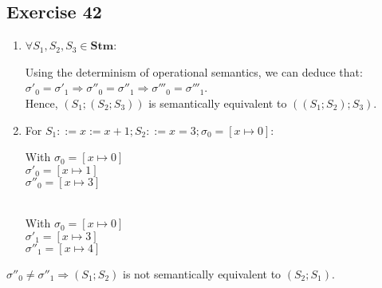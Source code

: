 \documentclass[12pt,fleqn]{article}		%
\begin{document}
\subsection{Exercise 42}
\begin{enumerate}
\item $ \forall S_1, S_2, S_3 \in \textbf{Stm} $:
\begin{prooftree}
\end{prooftree}
\begin{prooftree}
\end{prooftree}
Using the determinism of operational semantics, we can deduce that:\\
$ \sigma'_0 = \sigma'_1 \Rightarrow \sigma''_0 = \sigma''_1 \Rightarrow \sigma'''_0 = \sigma'''_1 $.\\
Hence, $ (S_1; (S_2; S_3)) $ is semantically equivalent to $ ((S_1; S_2); S_3) $.
\item For $ S_1 ::= x := x + 1 ; S_2 ::= x = 3; \sigma_0 = [x \mapsto 0] $:
\begin{prooftree}
\end{prooftree}
With $ \sigma_0 = [x \mapsto 0] $\\
$ \sigma'_0 = [x \mapsto 1]$\\
$ \sigma''_0 = [x \mapsto 3] $
\\\\
\begin{prooftree}
\end{prooftree}
With $ \sigma_0 = [x \mapsto 0] $\\
$ \sigma'_1 = [x \mapsto 3]$\\
$ \sigma''_1 = [x \mapsto 4] $
\end{enumerate}
$ \sigma''_0 \not= \sigma''_1 \Rightarrow (S_1; S_2) $ is not semantically equivalent to $ (S_2; S_1) $.
\end{document}
